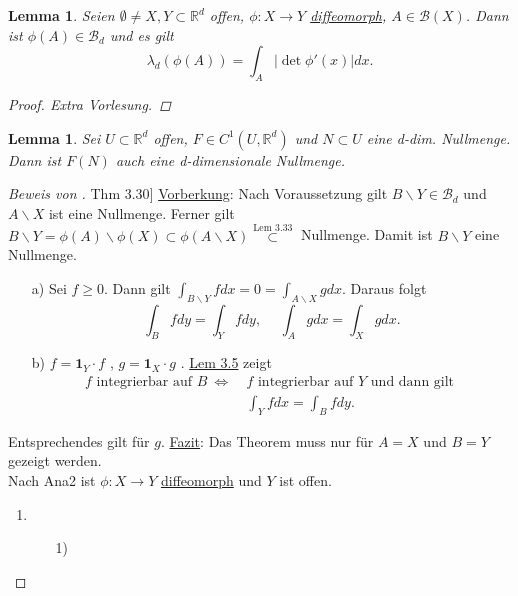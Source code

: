 \documentclass[a4paper]{scrreprt}
\newcommand{\doubleOne}{\textbf{1}}
\newcommand{\R}{\mathbb{R}}
\newcommand{\Borel}{\mathcal{B}}
\newcommand{\Bd}{\Borel_d}
\newcommand{\jlabel}[1]{\label{j_#1}}
\newcommand{\jshortlink}[1]{\jhyperref{#1}{\text{#1}}}
\newcommand{\jhyperref}[2]{\hyperref[j_#1]{#2}}
\newcommand{\jlink}[1]{\jhyperref{#1}{#1}}
\newcommand{\fu}{\text{\textit{(f.ü.)}}}
\newcommand{\jabb}[3]{ #1: #2 \rightarrow #3 }
\theoremstyle{plain}
\newtheorem{lem}[thm]{Lemma}
\theoremstyle{definition}
\begin{document}
{{{{\begin{lem}
    \jlabel{Lem 3.32}
    Seien $\emptyset \ne X,Y \subset \R^d$ offen, $\jabb{\phi}{X}{Y}$ \jlink{diffeomorph}, $A\in \Borel(X)$. Dann ist $\phi(A)\in \Bd$ und es gilt
    \[
        \lambda_d(\phi(A)) = \int_A|\det \phi'(x)|dx.
    \]
    \begin{proof}
        Extra Vorlesung.
    \end{proof}
\end{lem}

\begin{lem}
    \jlabel{Lem 3.33}
    Sei $U\subset \R^d$ offen, $F\in C^1(U,\R^d)$ und $N\subset U$ eine d-dim. Nullmenge. Dann ist $F(N)$ auch eine d-dimensionale Nullmenge.
\end{lem}

\begin{proof}[Beweis von \jlink{Thm 3.30}]
    \uline{Vorberkung}: Nach Voraussetzung gilt $B\backslash Y \in \Bd$ und $A\backslash X$ ist eine Nullmenge. Ferner gilt $B\backslash Y = \phi(A)\backslash \phi(X) \subset \phi(A\backslash X) \overset{\jshortlink{Lem 3.33}}{\subset}$ Nullmenge. Damit ist $B\backslash Y$ eine Nullmenge.
    \begin{itemize}
        \item[a)] Sei $f\ge 0$. Dann gilt $\int_{B\backslash Y} f dx = 0 = \int_{A\backslash X} g dx$. Daraus folgt
            \[
                \int_B f dy = \int_Y f dy, \hspace{15pt} \int_A g dx = \int_X g dx.
            \]
        \item[b)] $f = \doubleOne_Y\cdot f$ \fu, $g = \doubleOne_X\cdot g$ \fu. \jlink{Lem 3.5} zeigt
        \[
            \begin{split}
                f\text{ integrierbar auf } B \ \Leftrightarrow \ &f \text{ integrierbar auf } Y \text{ und dann gilt }\\
                                                             &\int_Y f dx = \int_B f dy.
            \end{split}
        \]
    \end{itemize}
    Entsprechendes gilt für $g$. \uline{Fazit}: Das Theorem muss nur für $A=X$ und $B=Y$ gezeigt werden.\\
    Nach Ana2 ist $\jabb{\phi}{X}{Y}$ \jlink{diffeomorph} und $Y$ ist offen.
    \begin{enumerate}
        \item 
            \begin{itemize}
                \item[1)] 

\end{itemize}
\end{enumerate}
\end{proof}}}}}
\end{document}
